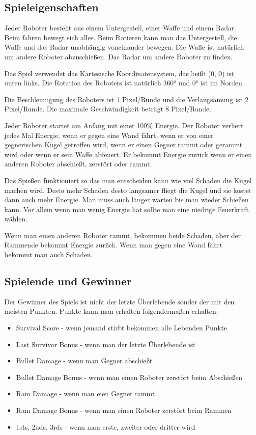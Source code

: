 \documentclass{article}
\begin{document}
\subsection{Spieleigenschaften}

Jeder Roboter besteht aus einem Untergestell, einer Waffe und einem Radar. Beim fahren bewegt sich alles. Beim Rotieren kann man das Untergestell, die Waffe und das Radar unabhängig voneinander bewegen. Die Waffe ist natürlich um andere Roboter abzuschießen. Das Radar um andere Roboter zu finden.

Das Spiel verwendet das Kartesische Koordinatensystem, das heißt (0, 0) ist unten links. Die Rotation des Roboters ist natürlich 360° und 0° ist im Norden. 

Die Beschleunigung des Roboters ist 1 Pixel/Runde und die Verlangsamung ist 2 Pixel/Runde. Die maximale Geschwindigkeit beträgt 8 Pixel/Runde.

Jeder Roboter startet am Anfang mit einer 100\% Energie.  
Der Roboter verliert jedes Mal Energie, wenn er gegen eine Wand fährt, wenn er von einer gegnerischen Kugel getroffen wird, wenn er einen Gegner rammt oder gerammt wird oder wenn er sein Waffe abfeuert. Er bekommt Energie zurück wenn er einen anderen Roboter abschießt, zerstört oder rammt.

Das Spießen funktioniert so das man entscheiden kann wie viel Schaden die Kugel machen wird. Desto mehr Schaden desto langsamer fliegt die Kugel und sie kostet dann auch mehr Energie. Man muss auch länger warten bis man wieder Schießen kann. Vor allem wenn man wenig Energie hat sollte man eine niedrige Feuerkraft wählen.

Wenn man einen anderen Roboter rammt, bekommen beide Schaden, aber der Rammende bekommt Energie zurück. Wenn man gegen eine Wand fährt bekommt man auch Schaden.

\subsection{Spielende und Gewinner}

Der Gewinner des Spiels ist nicht der letzte Überlebende sonder der mit den meisten Punkten. Punkte kann man erhalten folgendermaßen erhalten:

\begin{itemize}
\item Survival Score - wenn jemand stirbt bekommen alle Lebenden Punkte
\item Last Survivor Bonus - wenn man der letzte Überlebende ist
\item Bullet Damage - wenn man Gegner abschießt
\item Bullet Damage Bonus - wenn man einen Roboter zerstört beim Abschießen 
\item Ram Damage - wenn man eien Gegner rammt
\item Ram Damage Bonus - wenn man einen Roboter zerstört beim Rammen 
\item 1sts, 2nds, 3rds - wenn man erste, zweiter oder dritter wird
\end{itemize}
\end{document}
